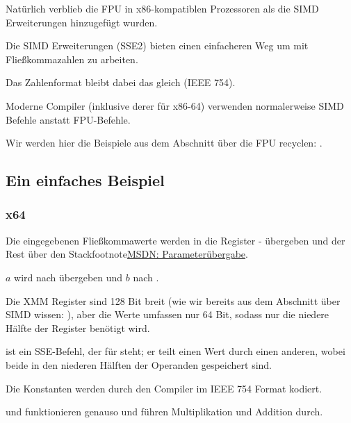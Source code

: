 
\label{floating_SIMD}
Natürlich verblieb die \ac{FPU} in x86-kompatiblen Prozessoren als die \ac{SIMD} Erweiterungen hinzugefügt wurden.

Die \ac{SIMD} Erweiterungen (SSE2) bieten einen einfacheren Weg um mit Fließkommazahlen zu arbeiten.

Das Zahlenformat bleibt dabei das gleich (IEEE 754).

Moderne Compiler (inklusive derer für x86-64) verwenden normalerweise \ac{SIMD} Befehle anstatt FPU-Befehle.

Wir werden hier die Beispiele aus dem Abschnitt über die FPU recyclen: .

\subsection{Ein einfaches Beispiel}



\subsubsection{x64}


Die eingegebenen Fließkommawerte werden in die Register - übergeben und der Rest über den
Stackfootnote{\href{http://go.yurichev.com/17263}{MSDN: Parameterübergabe}}.

$a$ wird nach  übergeben und $b$ nach .

Die XMM Register sind 128 Bit breit (wie wir bereits aus dem Abschnitt über \ac{SIMD} wissen: ), aber
die \Tdouble Werte umfassen nur 64 Bit, sodass nur die niedere Hälfte der Register benötigt wird.

 ist ein SSE-Befehl, der für  
 steht;
er teilt einen \Tdouble Wert durch einen anderen, wobei beide in den niederen Hälften der Operanden gespeichert sind. 

Die Konstanten werden durch den Compiler im IEEE 754 Format kodiert.

 und  funktionieren genauso und führen Multiplikation und Addition durch.

